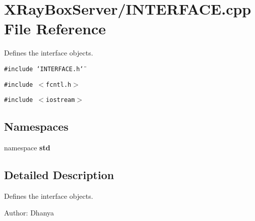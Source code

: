 \section{XRay\-Box\-Server/INTERFACE.cpp File Reference}
\label{INTERFACE_8cpp}
Defines the interface objects. 

{\tt \#include \char`\"{}INTERFACE.h\char`\"{}}\par
{\tt \#include $<$fcntl.h$>$}\par
{\tt \#include $<$iostream$>$}\par
\subsection*{Namespaces}
\begin{CompactItemize}
\item 
namespace \bf{std}
\end{CompactItemize}


\subsection{Detailed Description}
Defines the interface objects. 

\begin{Desc}
\item[Author:]Dhanya \end{Desc}
